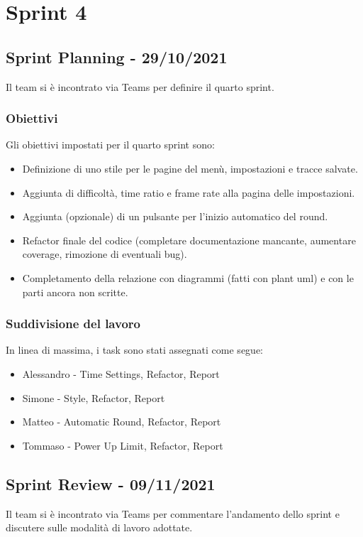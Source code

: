 \section{Sprint 4}
\subsection{Sprint Planning - 29/10/2021}
Il team si è incontrato via Teams per definire il quarto sprint.

\subsubsection{Obiettivi}
Gli obiettivi impostati per il quarto sprint sono:
\begin{itemize}
    \item Definizione di uno stile per le pagine del menù, impostazioni e tracce salvate.
    \item Aggiunta di difficoltà, time ratio e frame rate alla pagina delle impostazioni.
    \item Aggiunta (opzionale) di un pulsante per l'inizio automatico del round.
    \item Refactor finale del codice (completare documentazione mancante, aumentare coverage, rimozione di eventuali bug).
    \item Completamento della relazione con diagrammi (fatti con plant uml) e con le parti ancora non scritte.
\end{itemize}

\subsubsection{Suddivisione del lavoro}
In linea di massima, i task sono stati assegnati come segue:
\begin{itemize}
    \item Alessandro - Time Settings, Refactor, Report
    \item Simone - Style, Refactor, Report
    \item Matteo - Automatic Round, Refactor, Report
    \item Tommaso - Power Up Limit, Refactor, Report
\end{itemize}

\subsection{Sprint Review - 09/11/2021}
Il team si è incontrato via Teams per commentare l'andamento dello sprint e discutere sulle modalità di lavoro adottate.

